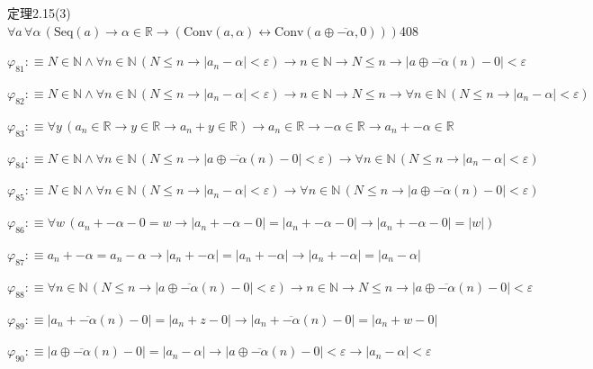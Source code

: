 \begin{fullproof}{定理2.15(3)}{$\forall a\,\forall \alpha\,(\mathrm{Seq}(a) \to \alpha \in \mathbb{R} \to (\mathrm{Conv}(a,\alpha) \leftrightarrow \mathrm{Conv}(a \oplus \overline{-\alpha},0)))$}{408}
\begin{abbrevlist}
\item $\varphi_{81} :\equiv N \in \mathbb{N} \land \forall n \in \mathbb{N}\,(N \leq n \to \lvert a_{n} - \alpha \rvert < \varepsilon) \to n \in \mathbb{N} \to N \leq n \to \lvert a \oplus \overline{-\alpha}(n) - 0 \rvert < \varepsilon$
\item $\varphi_{82} :\equiv N \in \mathbb{N} \land \forall n \in \mathbb{N}\,(N \leq n \to \lvert a_{n} - \alpha \rvert < \varepsilon) \to n \in \mathbb{N} \to N \leq n \to \forall n \in \mathbb{N}\,(N \leq n \to \lvert a_{n} - \alpha \rvert < \varepsilon)$
\item $\varphi_{83} :\equiv \forall y\,(a_{n} \in \mathbb{R} \to y \in \mathbb{R} \to a_{n} + y \in \mathbb{R}) \to a_{n} \in \mathbb{R} \to -\alpha \in \mathbb{R} \to a_{n} + -\alpha \in \mathbb{R}$
\item $\varphi_{84} :\equiv N \in \mathbb{N} \land \forall n \in \mathbb{N}\,(N \leq n \to \lvert a \oplus \overline{-\alpha}(n) - 0 \rvert < \varepsilon) \to \forall n \in \mathbb{N}\,(N \leq n \to \lvert a_{n} - \alpha \rvert < \varepsilon)$
\item $\varphi_{85} :\equiv N \in \mathbb{N} \land \forall n \in \mathbb{N}\,(N \leq n \to \lvert a_{n} - \alpha \rvert < \varepsilon) \to \forall n \in \mathbb{N}\,(N \leq n \to \lvert a \oplus \overline{-\alpha}(n) - 0 \rvert < \varepsilon)$
\item $\varphi_{86} :\equiv \forall w\,(a_{n} + -\alpha - 0 = w \to \lvert a_{n} + -\alpha - 0 \rvert = \lvert a_{n} + -\alpha - 0 \rvert \to \lvert a_{n} + -\alpha - 0 \rvert = \lvert w \rvert)$
\item $\varphi_{87} :\equiv a_{n} + -\alpha = a_{n} - \alpha \to \lvert a_{n} + -\alpha \rvert = \lvert a_{n} + -\alpha \rvert \to \lvert a_{n} + -\alpha \rvert = \lvert a_{n} - \alpha \rvert$
\item $\varphi_{88} :\equiv \forall n \in \mathbb{N}\,(N \leq n \to \lvert a \oplus \overline{-\alpha}(n) - 0 \rvert < \varepsilon) \to n \in \mathbb{N} \to N \leq n \to \lvert a \oplus \overline{-\alpha}(n) - 0 \rvert < \varepsilon$
\item $\varphi_{89} :\equiv \lvert a_{n} + \overline{-\alpha}(n) - 0 \rvert = \lvert a_{n} + z - 0 \rvert \to \lvert a_{n} + \overline{-\alpha}(n) - 0 \rvert = \lvert a_{n} + w - 0 \rvert$
\item $\varphi_{90} :\equiv \lvert a \oplus \overline{-\alpha}(n) - 0 \rvert = \lvert a_{n} - \alpha \rvert \to \lvert a \oplus \overline{-\alpha}(n) - 0 \rvert < \varepsilon \to \lvert a_{n} - \alpha \rvert < \varepsilon$

\end{abbrevlist}
\end{fullproof}
